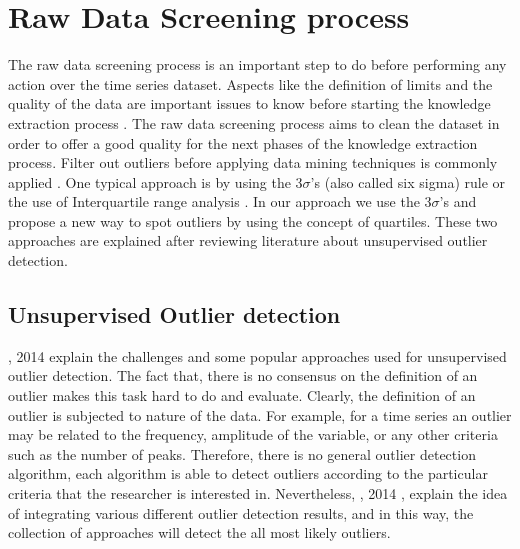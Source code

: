 


\section{Raw Data Screening process}

The raw data screening process is an important step to do before performing any action over the time series dataset. Aspects like the definition of limits and the quality of the data are important issues to know before starting the knowledge extraction process \cite{miller2015forensically}. The raw data screening process aims to clean the dataset in order to offer a good quality for the next phases of the knowledge extraction process. Filter out outliers before applying data mining techniques is commonly applied \cite{miller2015forensically, capozzoli2015fault,lin2003symbolic,kohavi2001data,lin2007experiencing}. One typical approach is by using the $3\sigma$'s (also called six sigma) rule \cite{wiborg2014applied,miller2015automated} or the use of Interquartile range analysis \cite{bickel2015mathematical}. In our approach we use the $3\sigma$'s and propose a new way to spot outliers by using the concept of quartiles. These two approaches are explained after reviewing literature about unsupervised outlier detection. 

\subsection{Unsupervised Outlier detection}

\citeauthor{zimek2014ensembles}, 2014 \cite{zimek2014ensembles} explain the challenges and some popular approaches used for unsupervised outlier detection. The fact that, there is no consensus on the definition of an outlier makes this task hard to do and evaluate. Clearly, the definition of an outlier is subjected to nature of the data. For example, for a time series an outlier may be related to the frequency, amplitude of the variable, or any other criteria such as the number of peaks. Therefore, there is no general outlier detection algorithm, each algorithm is able to detect outliers according to the particular criteria that the researcher is interested in. Nevertheless, \citeauthor{zimek2014ensembles}, 2014 \citep{zimek2014ensembles}, explain the idea of integrating various different outlier detection results, and in this way, the collection of approaches will detect the all most likely outliers.


